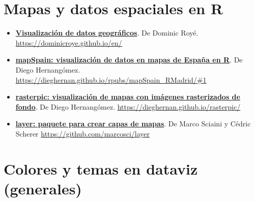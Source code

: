 \documentclass[11pt,]{book}
\begin{document}
\hypertarget{mapas-y-datos-espaciales-en-r}{%
\section*{Mapas y datos espaciales en R}\label{mapas-y-datos-espaciales-en-r}}


\begin{itemize}
\item
  \href{https://dominicroye.github.io/en/}{\textbf{Visualización de datos geográficos}}. De Dominic Royé. \url{https://dominicroye.github.io/en/}
\item
  \href{https://dieghernan.github.io/rpubs/mapSpain_RMadrid/\#1}{\textbf{mapSpain: visualización de datos en mapas de España en R}}. De Diego Hernangómez. \url{https://dieghernan.github.io/rpubs/mapSpain_RMadrid/\#1}
\item
  \href{https://dieghernan.github.io/rasterpic/}{\textbf{rasterpic: visualización de mapas con imágenes rasterizados de fondo}}. De Diego Hernangómez. \url{https://dieghernan.github.io/rasterpic/}
\item
  \href{https://github.com/marcosci/layer}{\textbf{layer: paquete para crear capas de mapas}}. De Marco Sciaini y Cédric Scherer \url{https://github.com/marcosci/layer}
\end{itemize}

\hypertarget{colores-y-temas-en-dataviz-generales}{%
\section*{Colores y temas en dataviz (generales)}\label{colores-y-temas-en-dataviz-generales}}
\end{document}

